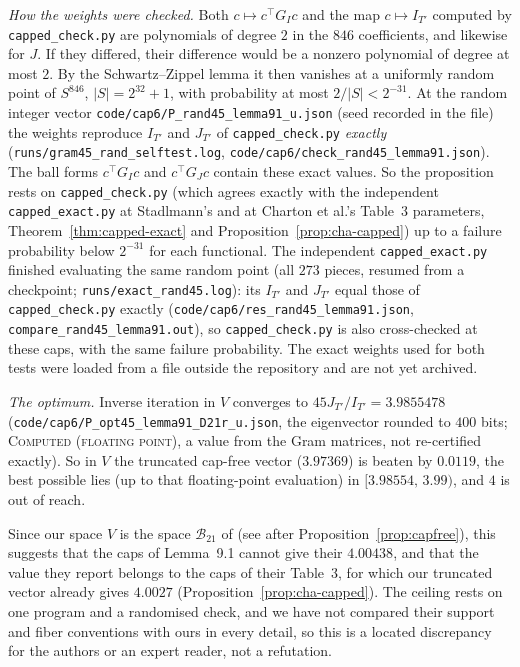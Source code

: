 \documentclass[11pt]{amsart}
\theoremstyle{definition}
\theoremstyle{remark}
\newcommand{\lbl}[1]{\textup{\textsc{#1}}}
\begin{document}
\emph{How the weights were checked.} Both $c\mapsto c^{\top}G_Ic$ and the map
$c\mapsto I_{T'}$ computed by \texttt{capped\_check.py} are polynomials of
degree $2$ in the $846$ coefficients, and likewise for $J$. If they differed,
their difference would be a nonzero polynomial of degree at most $2$. By the
Schwartz--Zippel lemma it then vanishes at a uniformly random point of
$S^{846}$, $|S|=2^{32}+1$, with probability at most $2/|S|<2^{-31}$. At the
random integer vector \texttt{code/cap6/P\_rand45\_lemma91\_u.json} (seed
recorded in the file) the weights reproduce $I_{T'}$ and $J_{T'}$ of
\texttt{capped\_check.py} \emph{exactly}
(\texttt{runs/gram45\_rand\_selftest.log}, \texttt{code/cap6/check\_rand45\_lemma91.json}).
The ball forms $c^{\top}G_Ic$ and $c^{\top}G_Jc$ contain these exact
values. So the proposition rests on \texttt{capped\_check.py} (which agrees
exactly with the independent \texttt{capped\_exact.py} at Stadlmann's and at
Charton et al.'s Table~3 parameters, Theorem~\ref{thm:capped-exact} and
Proposition~\ref{prop:cha-capped}) up to a failure probability below
$2^{-31}$ for each functional. The independent
\texttt{capped\_exact.py} finished evaluating the same random point (all $273$
pieces, resumed from a checkpoint; \texttt{runs/exact\_rand45.log}): its
$I_{T'}$ and $J_{T'}$ equal those of \texttt{capped\_check.py} exactly
(\texttt{code/cap6/res\_rand45\_lemma91.json}, \texttt{compare\_rand45\_lemma91.out}),
so \texttt{capped\_check.py} is also cross-checked at these caps, with the same
failure probability. The exact weights used for both tests were loaded from a file outside
the repository and are not yet archived.

\begin{sloppypar}
\emph{The optimum.} Inverse iteration in $V$ converges to
$45J_{T'}/I_{T'}=3.9855478$ (\texttt{code/cap6/}\allowbreak\texttt{P\_opt45\_lemma91\_D21r\_u.json},
the eigenvector rounded to $400$ bits; \lbl{Computed (floating point)}, a value
from the Gram matrices, not re-certified exactly). So in $V$ the truncated
cap-free vector ($3.97369$) is beaten by $0.0119$, the best possible lies
(up to that floating-point evaluation) in $[3.98554,\,3.99)$, and $4$ is out
of reach.
\end{sloppypar}

Since our space $V$ is the space $\mathcal B_{21}$ of \cite[Thm.~11.1]{Cha26}
(see after Proposition~\ref{prop:capfree}), this suggests that the caps of
Lemma~9.1 cannot give their $4.00438$, and that the value they report belongs
to the caps of their Table~3, for which our truncated vector already gives
$4.0027$ (Proposition~\ref{prop:cha-capped}). The ceiling rests on one
program and a randomised check, and we have not compared their support and
fiber conventions with ours in every detail, so this is a located discrepancy
for the authors or an expert reader, not a refutation.
\end{document}
